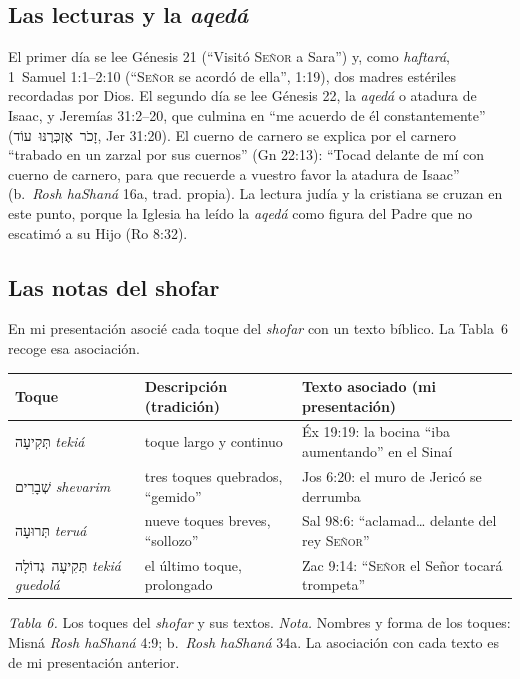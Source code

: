 \documentclass[11pt,letterpaper]{article}
\newcommand{\heb}[1]{\mbox{\foreignlanguage{hebrew}{#1}}}
\newcommand{\SENOR}{\textsc{Señor}}
\begin{document}
\subsection{Las lecturas y la \emph{aqedá}}
El primer día se lee Génesis 21 (``Visitó \SENOR{} a Sara'') y, como \emph{haftará}, 1~Samuel 1:1--2:10 (``\SENOR{} se acordó de ella'', 1:19), dos madres estériles recordadas por Dios. El segundo día se lee Génesis 22, la \emph{aqedá} o atadura de Isaac, y Jeremías 31:2--20, que culmina en ``me acuerdo de él constantemente'' (\heb{זָכֹר אֶזְכְּרֶנּוּ עוֹד}, Jer 31:20). El cuerno de carnero se explica por el carnero ``trabado en un zarzal por sus cuernos'' (Gn 22:13): ``Tocad delante de mí con cuerno de carnero, para que recuerde a vuestro favor la atadura de Isaac'' (b.~\emph{Rosh haShaná} 16a, trad. propia). La lectura judía y la cristiana se cruzan en este punto, porque la Iglesia ha leído la \emph{aqedá} como figura del Padre que no escatimó a su Hijo (Ro 8:32).

\subsection{Las notas del shofar}
En mi presentación asocié cada toque del \emph{shofar} con un texto bíblico. La Tabla~6 recoge esa asociación.

\begin{center}\begin{minipage}{\linewidth}\centering\small\renewcommand{\arraystretch}{1.16}
\begin{tabular}{@{}L{3.4cm}L{5.2cm}L{5.8cm}@{}}
\toprule
\textbf{Toque} & \textbf{Descripción (tradición)} & \textbf{Texto asociado (mi presentación)} \\ \midrule
\heb{תְּקִיעָה} \emph{tekiá} & toque largo y continuo & Éx 19:19: la bocina ``iba aumentando'' en el Sinaí \\
\heb{שְׁבָרִים} \emph{shevarim} & tres toques quebrados, ``gemido'' & Jos 6:20: el muro de Jericó se derrumba \\
\heb{תְּרוּעָה} \emph{teruá} & nueve toques breves, ``sollozo'' & Sal 98:6: ``aclamad\ldots{} delante del rey \SENOR'' \\
\heb{תְּקִיעָה גְדוֹלָה} \emph{tekiá guedolá} & el último toque, prolongado & Zac 9:14: ``\SENOR{} el Señor tocará trompeta'' \\
\bottomrule
\end{tabular}\par
{\footnotesize\color{sepia}\textit{Tabla 6.} Los toques del \emph{shofar} y sus textos. \textit{Nota.} Nombres y forma de los toques: Misná \emph{Rosh haShaná} 4:9; b.~\emph{Rosh haShaná} 34a. La asociación con cada texto es de mi presentación anterior.}
\end{minipage}\end{center}
\end{document}
